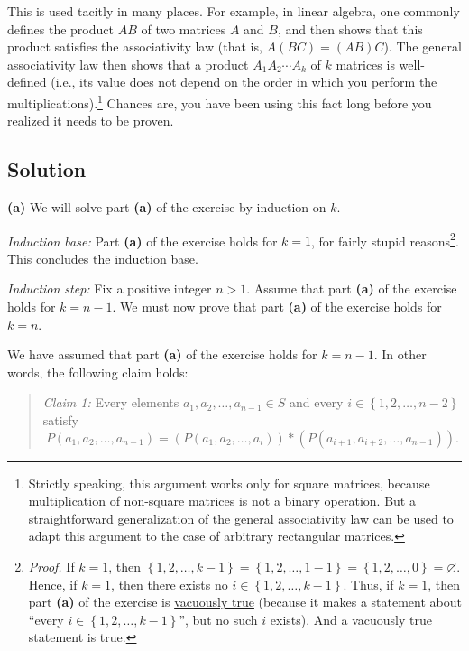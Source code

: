 \documentclass[paper=a4, fontsize=12pt]{scrartcl} %
\newcommand{\set}[1]{\left\{ #1 \right\}}
\newcommand{\tup}[1]{\left( #1 \right)}
\theoremstyle{plainsl}
\theoremstyle{definition}
\theoremstyle{remark}
\newenvironment{statement}{\begin{quote}}{\end{quote}}
\begin{document}
This is used tacitly in many places.
For example, in linear algebra, one commonly defines
the product $AB$ of two matrices $A$ and $B$, and then
shows that this product satisfies the associativity law
(that is, $A \tup{BC} = \tup{AB} C$).
The general associativity law then shows that a product
$A_1 A_2 \cdots A_k$ of $k$ matrices is well-defined
(i.e., its value does not depend on the order in which
you perform the multiplications).\footnote{Strictly
speaking, this argument works only for square matrices,
because multiplication of non-square matrices is not
a binary operation.
But a straightforward generalization of the general
associativity law can be used to adapt this argument
to the case of arbitrary rectangular matrices.}
Chances are, you have been using this fact long before
you realized it needs to be proven.

\subsection{Solution}

\textbf{(a)}
We will solve part \textbf{(a)} of the exercise by
induction on $k$.

\textit{Induction base:}
Part \textbf{(a)} of the exercise holds for $k = 1$,
for fairly stupid reasons\footnote{\textit{Proof.}
If $k = 1$, then
$\set{1, 2, \ldots, k-1} = \set{1, 2, \ldots, 1-1}
= \set{1, 2, \ldots, 0} = \varnothing$.
Hence, if $k = 1$, then there exists no
$i \in \set{1, 2, \ldots, k-1}$.
Thus, if $k = 1$, then part \textbf{(a)} of the
exercise is
\href{https://en.wikipedia.org/wiki/Vacuous_truth}{vacuously true}
(because it makes a statement about ``every
$i \in \set{1, 2, \ldots, k-1}$'', but no such $i$
exists).
And a vacuously true statement is true.}.
This concludes the induction base.

\textit{Induction step:} Fix a positive integer $n > 1$.
Assume that part \textbf{(a)} of the exercise holds
for $k = n-1$.
We must now prove that part \textbf{(a)} of the exercise
holds for $k = n$.

We have assumed that part \textbf{(a)} of the exercise
holds for $k = n-1$.
In other words, the following claim holds:

\begin{statement}
\textit{Claim 1:}
Every elements $a_1, a_2, \ldots, a_{n-1} \in S$
and every $i \in \set{1, 2, \ldots, n-2}$ satisfy
\[
P \tup{a_1, a_2, \ldots, a_{n-1}}
= \tup{P \tup{a_1, a_2, \ldots, a_i}}
     * \tup{P \tup{a_{i+1}, a_{i+2}, \ldots, a_{n-1}}} .
\]
\end{statement}
\end{document}
